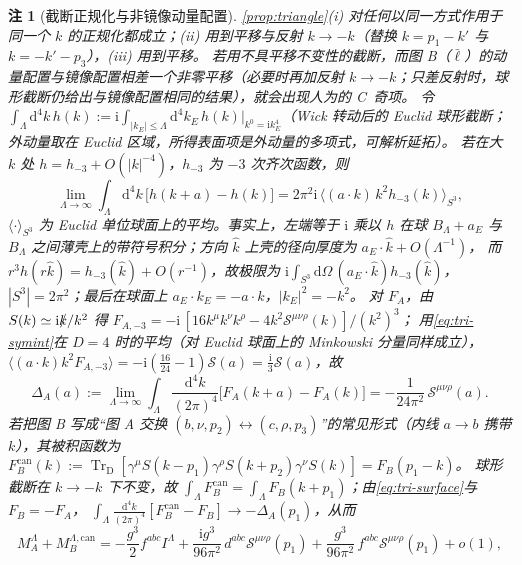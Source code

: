 \documentclass[UTF8,a4paper,11pt,fontset=fandol]{ctexart}
\theoremstyle{cplain}
\theoremstyle{cdefinition}
\theoremstyle{cremark}
\newtheorem{remark}[theorem]{注}
\numberwithin{equation}{section}
\newcommand{\TrD}{\operatorname{Tr}_{\mathrm{D}}}   %
\newcommand{\sla}[1]{\slashed{#1}}                  %
\newcommand{\dd}{\mathrm{d}}                         %
\newcommand{\ii}{\mathrm{i}}                        %
\begin{document}
\begin{remark}[截断正规化与非镜像动量配置]\label{rem:tri-cutoff}
\cref{prop:triangle}(i) 对任何以同一方式作用于同一个 $k$ 的正规化都成立；(ii) 用到平移与反射 $k\to-k$（替换 $k=p_1-k'$ 与 $k=-k'-p_3$），(iii) 用到平移。
若用不具平移不变性的截断，而图 B（$\bar\ell$）的动量配置与镜像配置相差一个非零平移（必要时再加反射 $k\to-k$；只差反射时，球形截断仍给出与镜像配置相同的结果），就会出现人为的 C~奇项。
令 $\int_\Lambda\dd^4k\,h(k):=\ii\int_{|k_E|\le\Lambda}\dd^4k_E\,h(k)|_{k^0=\ii k_E^4}$（Wick 转动后的 Euclid 球形截断；外动量取在 Euclid 区域，所得表面项是外动量的多项式，可解析延拓）。
若在大 $k$ 处 $h=h_{-3}+O(|k|^{-4})$，$h_{-3}$ 为 $-3$ 次齐次函数，则
\begin{equation}\label{eq:tri-surface}
\lim_{\Lambda\to\infty}\int_\Lambda\dd^4k\,\bigl[h(k+a)-h(k)\bigr]=2\pi^2\ii\,\bigl\langle(a\cdot k)\,k^2h_{-3}(k)\bigr\rangle_{S^3},
\end{equation}
$\langle\cdot\rangle_{S^3}$ 为 Euclid 单位球面上的平均。事实上，左端等于 $\ii$ 乘以 $h$ 在球 $B_\Lambda+a_E$ 与 $B_\Lambda$ 之间薄壳上的带符号积分；方向 $\hat k$ 上壳的径向厚度为 $a_E\cdot\hat k+O(\Lambda^{-1})$，
而 $r^3h(r\hat k)=h_{-3}(\hat k)+O(r^{-1})$，故极限为 $\ii\int_{S^3}\dd\Omega\,(a_E\cdot\hat k)h_{-3}(\hat k)$，$|S^3|=2\pi^2$；最后在球面上 $a_E\cdot k_E=-a\cdot k$，$|k_E|^2=-k^2$。
对 $F_A$，由 $S(k)\simeq\ii\sla k/k^2$ 得 $F_{A,-3}=-\ii\,[16k^\mu k^\nu k^\rho-4k^2\mathcal S^{\mu\nu\rho}(k)]/(k^2)^3$；
用\cref{eq:tri-symint}在 $D=4$ 时的平均（对 Euclid 球面上的 Minkowski 分量同样成立），$\langle(a\cdot k)k^2F_{A,-3}\rangle=-\ii(\frac{16}{24}-1)\mathcal S(a)=\frac{\ii}{3}\mathcal S(a)$，故
\begin{equation}\label{eq:tri-DeltaA}
\Delta_A(a):=\lim_{\Lambda\to\infty}\int_\Lambda\frac{\dd^4k}{(2\pi)^4}\bigl[F_A(k+a)-F_A(k)\bigr]=-\frac{1}{24\pi^2}\,\mathcal S^{\mu\nu\rho}(a).
\end{equation}
若把图 B 写成“图 A 交换 $(b,\nu,p_2)\leftrightarrow(c,\rho,p_3)$”的常见形式（内线 $a\to b$ 携带 $k$），其被积函数为
$F_B^{\mathrm{can}}(k):=\TrD[\gamma^\mu S(k-p_1)\gamma^\rho S(k+p_2)\gamma^\nu S(k)]=F_B(p_1-k)$。
球形截断在 $k\to-k$ 下不变，故 $\int_\Lambda F_B^{\mathrm{can}}=\int_\Lambda F_B(k+p_1)$；由\cref{eq:tri-surface}与 $F_B=-F_A$，
$\int_\Lambda\frac{\dd^4k}{(2\pi)^4}[F_B^{\mathrm{can}}-F_B]\to-\Delta_A(p_1)$，从而
\begin{equation}\label{eq:tri-spurious}
M_A^\Lambda+M_B^{\Lambda,\mathrm{can}}=-\frac{g^3}{2}f^{abc}I^\Lambda+\frac{\ii g^3}{96\pi^2}\,d^{abc}\mathcal S^{\mu\nu\rho}(p_1)+\frac{g^3}{96\pi^2}\,f^{abc}\mathcal S^{\mu\nu\rho}(p_1)+o(1),

\end{equation}
\end{remark}
\end{document}
